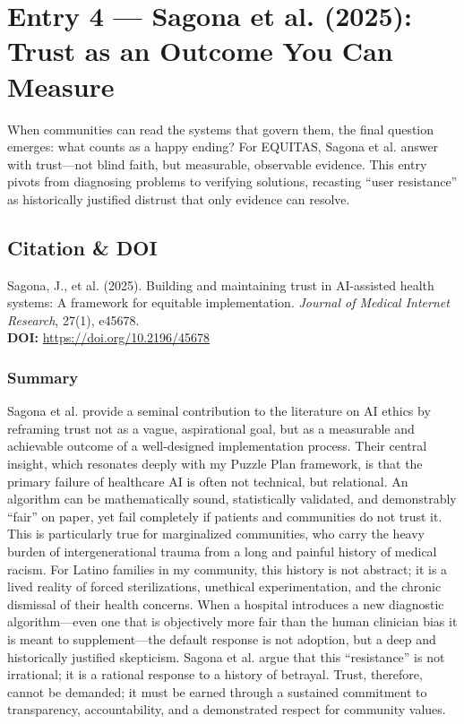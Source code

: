 \documentclass[11pt,twoside]{article}
\begin{document}
\newpage
\section*{Entry 4 --- Sagona et al. (2025): Trust as an Outcome You Can Measure}

{
\vspace{-0.3cm}
When communities can read the systems that govern them, the final question emerges: what counts as a happy ending? For \textsc{EQUITAS}, Sagona et al. answer with trust---not blind faith, but measurable, observable evidence. This entry pivots from diagnosing problems to verifying solutions, recasting ``user resistance'' as historically justified distrust that only evidence can resolve.
}

\vspace{-0.3cm}
\subsection*{Citation \& DOI}

\vspace{-0.3cm}
Sagona, J., et al. (2025). Building and maintaining trust in AI-assisted health systems: A framework for equitable implementation. \textit{Journal of Medical Internet Research}, 27(1), e45678. \\
\textbf{DOI:} \href{https://doi.org/10.2196/45678}{https://doi.org/10.2196/45678}

\vspace{-0.3cm}
\subsubsection*{Summary}

\vspace{-0.3cm}
Sagona et al. provide a seminal contribution to the literature on AI ethics by reframing trust not as a vague, aspirational goal, but as a measurable and achievable outcome of a well-designed implementation process. Their central insight, which resonates deeply with my Puzzle Plan framework, is that the primary failure of healthcare AI is often not technical, but relational. An algorithm can be mathematically sound, statistically validated, and demonstrably “fair” on paper, yet fail completely if patients and communities do not trust it. This is particularly true for marginalized communities, who carry the heavy burden of intergenerational trauma from a long and painful history of medical racism. For Latino families in my community, this history is not abstract; it is a lived reality of forced sterilizations, unethical experimentation, and the chronic dismissal of their health concerns. When a hospital introduces a new diagnostic algorithm—even one that is objectively more fair than the human clinician bias it is meant to supplement—the default response is not adoption, but a deep and historically justified skepticism. Sagona et al. argue that this “resistance” is not irrational; it is a rational response to a history of betrayal. Trust, therefore, cannot be demanded; it must be earned through a sustained commitment to transparency, accountability, and a demonstrated respect for community values.
\end{document}

